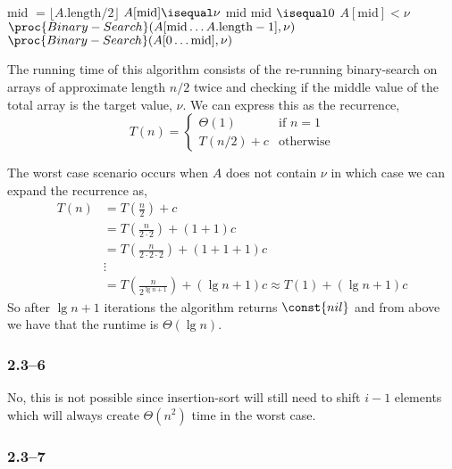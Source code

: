 \begin{codebox}
	\li mid $= \lfloor A.\text{length}/2 \rfloor$
	\li \If $A[\text{mid}] \isequal \nu$
	\li \Then
				\Return mid
			\End
	\li \ElseIf mid $\isequal 0$
	\li	\Then
				\Return {}
			\End
	\li \ElseIf $A[\text{mid}]<\nu$
	\li	\Then
				$\proc{Binary-Search}(A[\text{mid}\ldots A.\text{length}-1], \nu)$
			\End
	\li \Else
	\li	\Then
				$\proc{Binary-Search}(A[0\ldots \text{mid}], \nu)$
			\End
\end{codebox}

The running time of this algorithm consists of the re-running binary-search on arrays of approximate length $n/2$ twice and checking if the middle value of the total array is the target value, $\nu$. We can express this as the recurrence,
\begin{equation*}
	T(n) =
	\begin{cases}
		\Theta(1)& \text{if }n=1\\
		T(n/2) + c& \text{otherwise}
	\end{cases}
\end{equation*}

The worst case scenario occurs when $A$ does not contain $\nu$ in which case we can expand the recurrence as,
\begin{equation*}
	\begin{aligned}
		T(n) &= T\left(\frac{n}{2}\right) + c\\
		&= T\left(\frac{n}{2\cdot2}\right) + (1 + 1)c\\
		&= T\left(\frac{n}{2\cdot2\cdot2}\right) + (1 + 1 + 1)c\\
		&\vdots\\
		&= T\left(\frac{n}{2^{\lg n + 1}}\right) + (\lg n + 1)c \approx T(1) + (\lg n + 1)c
	\end{aligned}
\end{equation*}
So after $\lg n + 1$ iterations the algorithm returns $\const{nil}$ and from above we have that the runtime is $\Theta(\lg n)$.

\subsubsection*{2.3--6}

No, this is not possible since insertion-sort will still need to shift $i-1$ elements which will always create $\Theta(n^{2})$ time in the worst case.

\subsubsection*{2.3--7}

